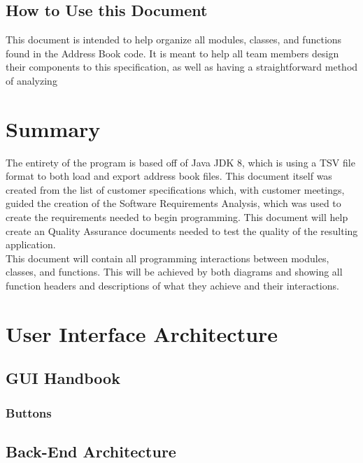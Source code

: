 \documentclass[a4paper, 11pt]{article}
\begin{document}
\subsection{How to Use this Document}
This document is intended to help organize all modules, classes, and functions found in the Address Book code. It is meant to help all team members design their components to this specification, as well as having a straightforward method of analyzing 
\section{Summary}
The entirety of the program is based off of Java JDK 8, which is using a TSV file format to both load and export address book files. This document itself was created from the list of customer specifications which, with customer meetings, guided the creation of the Software Requirements Analysis, which was used to create the requirements needed to begin programming. This document will help create an Quality Assurance documents needed to test the quality of the resulting application. \\
This document will contain all programming interactions between modules, classes, and functions. This will be achieved by both diagrams and showing all function headers and descriptions of what they achieve and their interactions.
\section{User Interface Architecture}
\subsection{GUI Handbook}



\subsubsection{Buttons}




\subsection{Back-End Architecture}
\end{document}

